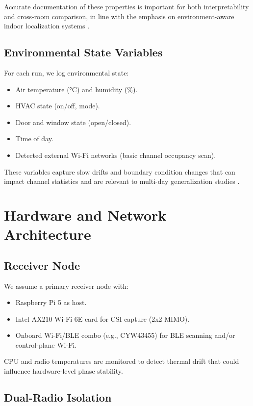 \documentclass[11pt,a4paper]{article}
\begin{document}
Accurate documentation of these properties is important for both interpretability and cross-room comparison, in line with the emphasis on environment-aware indoor localization systems \cite{sesyuk2022indoor,retscher2022indoor}.

\subsection{Environmental State Variables}

For each run, we log environmental state:

\begin{itemize}[leftmargin=*]
\item Air temperature (°C) and humidity (\%).
\item HVAC state (on/off, mode).
\item Door and window state (open/closed).
\item Time of day.
\item Detected external Wi-Fi networks (basic channel occupancy scan).
\end{itemize}

These variables capture slow drifts and boundary condition changes that can impact channel statistics and are relevant to multi-day generalization studies \cite{shahbazian2023human}.

\section{Hardware and Network Architecture}

\subsection{Receiver Node}

We assume a primary receiver node with:

\begin{itemize}[leftmargin=*]
\item Raspberry Pi 5 as host.
\item Intel AX210 Wi-Fi 6E card for CSI capture (2x2 MIMO).
\item Onboard Wi-Fi/BLE combo (e.g., CYW43455) for BLE scanning and/or control-plane Wi-Fi.
\end{itemize}

CPU and radio temperatures are monitored to detect thermal drift that could influence hardware-level phase stability.

\subsection{Dual-Radio Isolation}
\end{document}
